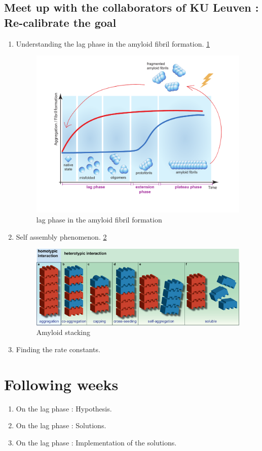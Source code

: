 \documentclass[11pt,a4paper]{article}
\begin{document}
\subsection{Meet up with the collaborators of KU Leuven : Re-calibrate the goal}
  \begin{enumerate}
    \item Understanding the lag phase in the amyloid fibril formation. \ref{fig:lag phase}
      \begin{figure}[!h]
      \centering
      \includegraphics[width=1\textwidth]{Images/Figuur2.pdf}
      \caption{lag phase in the amyloid fibril formation}
      \label{fig:lag phase}
      \end{figure}
    \item Self assembly phenomenon. \ref{fig:amyloid stacking}
      \begin{figure}[!h]
      \centering
      \includegraphics[width=1\textwidth]{Images/amyloidstacking_2.png}
      \caption{Amyloid stacking}
      \label{fig:amyloid stacking}
      \end{figure}

    \item Finding the rate constants.
  \end{enumerate}

\section{Following weeks}
\begin{enumerate}
\item On the lag phase : Hypothesis.
\item On the lag phase : Solutions.
\item On the lag phase : Implementation of the solutions.
\end{enumerate}

\clearpage


\end{document}
